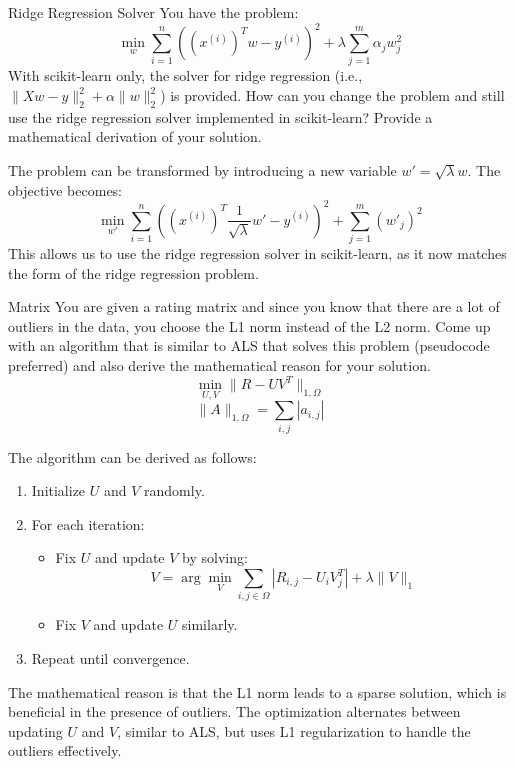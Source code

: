 \documentclass{article}
\begin{document}
\begin{exercise}{Ridge Regression Solver}
  You have the problem: 
    \[ \min_{w} \sum_{i=1}^{n} \left( \left(x^{(i)}\right)^T w - y^{(i)} \right)^2 + \lambda \sum_{j=1}^{m} \alpha_j w_j^2 \]
  With scikit-learn only, the solver for ridge regression (i.e., $\|Xw - y\|_2^2 + \alpha\|w\|_2^2$) is provided. How can you change the problem and still use the ridge regression solver implemented in scikit-learn? Provide a mathematical derivation of your solution.

  \begin{solution}
    The problem can be transformed by introducing a new variable $w' = \sqrt{\lambda} w$. The objective becomes:
    \[
      \min_{w'} \sum_{i=1}^{n} \left( \left(x^{(i)}\right)^T \frac{1}{\sqrt{\lambda}} w' - y^{(i)} \right)^2 + \sum_{j=1}^{m} \left(w'_j\right)^2
    \]
    This allows us to use the ridge regression solver in scikit-learn, as it now matches the form of the ridge regression problem.
  \end{solution}
\end{exercise}

\begin{exercise}{Matrix}
  You are given a rating matrix and since you know that there are a lot of outliers in the data, you choose the L1 norm instead of the L2 norm. Come up with an algorithm that is similar to ALS that solves this problem (pseudocode preferred) and also derive the mathematical reason for your solution.
    \[ \min_{U, V} \|R - UV^T\|_{1,\Omega} \]
    \[ \|A\|_{1,\Omega} = \sum_{i,j} |a_{i,j}| \]

  \begin{solution}
    The algorithm can be derived as follows:
    \begin{enumerate}
      \item Initialize $U$ and $V$ randomly.
      \item For each iteration:
        \begin{itemize}
          \item Fix $U$ and update $V$ by solving:
            \[
              V = \arg\min_{V} \sum_{i,j \in \Omega} |R_{i,j} - U_i V_j^T| + \lambda \|V\|_1
            \]
          \item Fix $V$ and update $U$ similarly.
        \end{itemize}
      \item Repeat until convergence.
    \end{enumerate}
    The mathematical reason is that the L1 norm leads to a sparse solution, which is beneficial in the presence of outliers. The optimization alternates between updating $U$ and $V$, similar to ALS, but uses L1 regularization to handle the outliers effectively.
  \end{solution}
\end{exercise}
\end{document}
